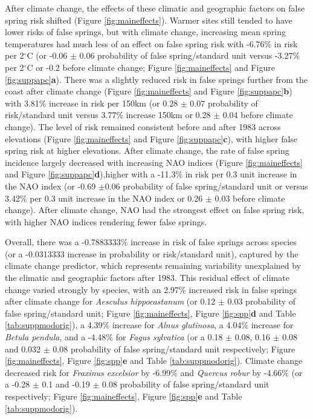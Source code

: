 \documentclass{article}\usepackage[]{graphicx}\usepackage[]{color}
\begin{document}
After climate change, the effects of these climatic and geographic factors on false spring risk shifted (Figure \ref{fig:maineffects}). Warmer sites still tended to have lower risks of false springs, but with climate change, increasing mean spring temperatures had much less of an effect on false spring risk with -6.76\% in risk per 2$^{\circ}$C (or -0.06 $\pm$ 0.06 probability of false spring/standard unit versus -3.27\% per 2$^{\circ}$C or -0.2 before climate change; Figure \ref{fig:maineffects} and Figure \ref{fig:suppapc}\textbf{a}). There was a slightly reduced risk in false springs further from the coast after climate change (Figure \ref{fig:maineffects} and Figure \ref{fig:suppapc}\textbf{b}) with 3.81\% increase in risk per 150km (or 0.28 $\pm$ 0.07 probability of risk/standard unit versus 3.77\% increase 150km or 0.28 $\pm$ 0.04 before climate change). The level of risk remained consistent before and after 1983 across elevations (Figure \ref{fig:maineffects} and Figure \ref{fig:suppapc}\textbf{c}), with higher false spring risk at higher elevations. After climate change, the rate of false spring incidence largely decreased with increasing NAO indices (Figure \ref{fig:maineffects} and Figure \ref{fig:suppapc}\textbf{d}),higher with a -11.3\% in risk per 0.3 unit increase in the NAO index (or -0.69 $\pm$0.06 probability of false spring/standard unit or versus 3.42\% per 0.3 unit increase in the NAO index or 0.26 $\pm$ 0.03 before climate change). After climate change, NAO had the strongest effect on false spring risk, with higher NAO indices rendering fewer false springs.

Overall, there was a -0.7883333\% increase in risk of false springs across species (or a -0.0313333 increase in probability or risk/standard unit), captured by the climate change predictor, which represents remaining variability unexplained by the climatic and geographic factors after 1983. This residual effect of climate change varied strongly by species, with an 2.97\% increased risk in false springs after climate change for \textit{Aesculus hippocastanum} (or 0.12 $\pm$ 0.03 probability of false spring/standard unit; Figure \ref{fig:maineffects}, Figure \ref{fig:spp}\textbf{d} and Table \ref{tab:suppmodorig}), a 4.39\% increase for \textit{Alnus glutinosa}, a 4.04\% increase for \textit{Betula pendula}, and a -4.48\% for \textit{Fagus sylvatica} (or a 0.18 $\pm$ 0.08, 0.16 $\pm$ 0.08 and 0.032 $\pm$ 0.08 probability of false spring/standard unit respectively; Figure \ref{fig:maineffects}, Figure \ref{fig:spp}\textbf{e} and Table \ref{tab:suppmodorig}). Climate change decreased risk for \textit{Fraxinus excelsior} by -6.99\% and \textit{Quercus robur} by -4.66\% (or a -0.28 $\pm$ 0.1 and -0.19 $\pm$ 0.08 probability of false spring/standard unit respectively; Figure \ref{fig:maineffects}, Figure \ref{fig:spp}\textbf{e} and Table \ref{tab:suppmodorig}).  
\end{document}
